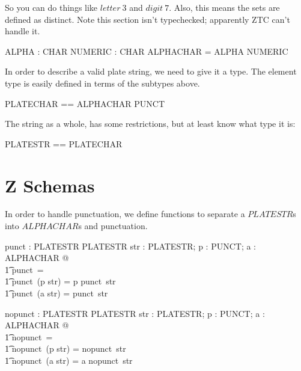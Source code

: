 \documentclass[11pt]{article}
\begin{document}
\begin{spec}
{\begin{minipage}{\linewidth}
      So you can do things like $letter~3$ and $digit~7$.  Also, this means the sets are defined as
      distinct.  Note this section isn't typechecked; apparently ZTC can't handle it.
    \end{minipage}
  }

  \begin{axdef}
    ALPHA : \power CHAR \also
    NUMERIC : \power CHAR
    \where
    ALPHACHAR = ALPHA \cup NUMERIC
  \end{axdef}

  In order to describe a valid plate string, we need to give it a type.  The element type is easily
  defined in terms of the subtypes above.

  \begin{zed}
    PLATECHAR == ALPHACHAR \cup PUNCT
  \end{zed}

  The string as a whole, has some restrictions, but at least know what type it is:

  \begin{zed}
    PLATESTR == \seq PLATECHAR
  \end{zed}



  \section{Z Schemas}

  In order to handle punctuation, we define functions to separate a $PLATESTR$s into $ALPHACHAR$s
  and punctuation.  

  \begin{axdef}
    punct : PLATESTR \fun PLATESTR
    \where
    \forall str : PLATESTR; p : PUNCT; a : ALPHACHAR @ \\
    \t1 punct~\langle \rangle = \langle \rangle \land \\
    \t1 punct~(\langle p \rangle \cat str) = \langle p \rangle \cat punct~str \land \\
    \t1 punct~(\langle a \rangle \cat str) = punct~str
  \end{axdef}

  \begin{axdef}
    nopunct : PLATESTR \fun PLATESTR
    \where
    \forall str : PLATESTR; p : PUNCT; a : ALPHACHAR  @ \\
    \t1 nopunct~\langle \rangle = \langle \rangle \land \\
    \t1 nopunct~(\langle p \rangle \cat str) = nopunct~str \land \\
    \t1 nopunct~(\langle a \rangle \cat str) = \langle a \rangle \cat nopunct~str
  \end{axdef}
  

\end{spec}
\end{document}
